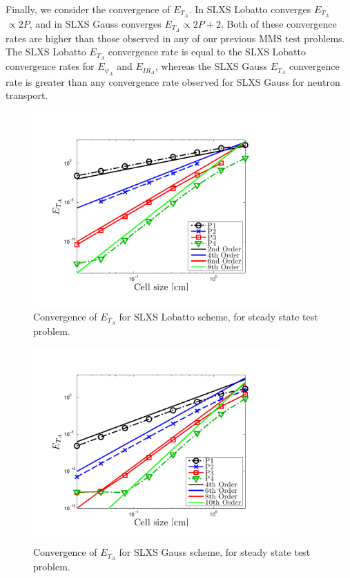 Finally, we consider the convergence of $E_{T_A}$.  
In  SLXS Lobatto converges $E_{T_A}$ $\propto 2P$, and in 
SLXS Gauss converges $E_{T_A} \propto 2P+2$.  
Both of these convergence rates are higher than those observed in any of our previous MMS test problems.
The SLXS Lobatto $E_{T_A}$ convergence rate is equal to the SLXS Lobatto convergence rates for $E_{\psi_A}$ and $E_{IR_A}$, whereas the SLXS Gauss $E_{T_A}$ convergence rate is greater than any convergence rate observed for SLXS Gauss for neutron transport.
\begin{figure}[!htp]
\centering
\includegraphics[width=9.5cm,trim=0.25in  0.25in 0.75in 0.5in,clip=true]{chapter6_grey_radtran/Dissertation_Data/Constant_Time_SLXS_Lobatto_temp_A.pdf}
\caption{Convergence of $E_{T_A}$ for SLXS Lobatto scheme, for steady state test problem.}
\label{fig:constant_time_lobatto_t_a}
\end{figure}
%
%
\begin{figure}[!hbp]
\centering
\includegraphics[width=9.5cm,trim=0.25in  0.25in 0.75in 0.5in,clip=true]{chapter6_grey_radtran/Dissertation_Data/Constant_Time_SLXS_Gauss_temp_A.pdf}
\caption{Convergence of $E_{T_A}$ for SLXS Gauss scheme, for steady state test problem.}
\label{fig:constant_time_gauss_t_a}
\end{figure}

